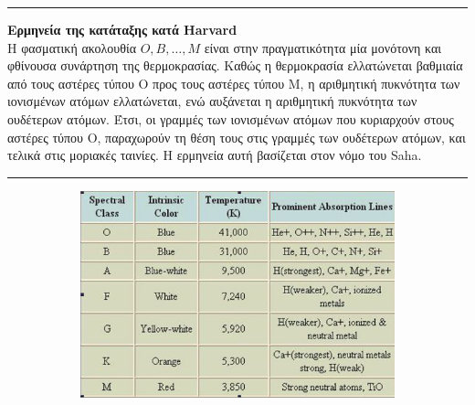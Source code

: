 {\color{red} \hrule}
\textbf{Ερμηνεία της κατάταξης κατά Harvard}\\
Η φασματική ακολουθία $ O, B, \dots, M$ είναι στην πραγματικότητα μία μονότονη και φθίνουσα συνάρτηση της θερμοκρασίας. Καθώς η θερμοκρασία ελλατώνεται βαθμιαία από τους αστέρες τύπου Ο προς τους αστέρες τύπου Μ, η αριθμητική πυκνότητα των ιονισμένων ατόμων ελλατώνεται, ενώ αυξάνεται η αριθμητική πυκνότητα των ουδέτερων ατόμων. Έτσι, οι γραμμές των ιονισμένων ατόμων που κυριαρχούν στους αστέρες τύπου Ο, παραχωρούν τη θέση τους στις γραμμές των ουδέτερων ατόμων, και τελικά στις μοριακές ταινίες. Η ερμηνεία αυτή βασίζεται στον νόμο του Saha.\\
{\color{red} \hrule}

\begin{figure}[h]
   \centering
\begin{subfigure}[h]{0.45\textwidth}
	\centering
   	 \includegraphics[angle=270,width=\textwidth]{Figures/spectral_class_table.png} 
\end{subfigure}
\begin{subfigure}[h]{0.5\textwidth}
	\centering

\end{subfigure}
\end{figure}
